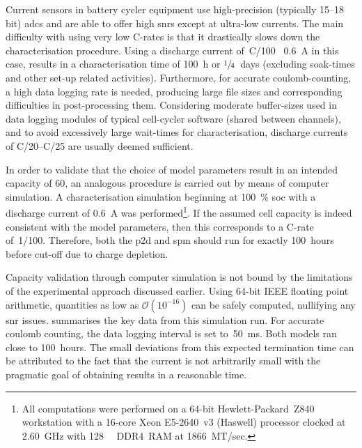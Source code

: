 Current sensors in battery cycler equipment use high-precision (typically 15--18
bit) \glspl{adc}  and are  able to  offer high  \glspl{snr} except  at ultra-low
currents. The main difficulty with using very low C-rates is that it drastically
slows down  the characterisation procedure.  Using a discharge  current of~C/100
\ie~\SI{0.6}{\ampere}  in  this case,  results  in  a characterisation  time  of
\SI{100}{\hour} or \mbox{$\sfrac{1}{4}$}~days (excluding soak-times and
other set-up related activities).  Furthermore, for accurate coulomb-counting, a
high data logging  rate is needed, producing large file  sizes and corresponding
difficulties in post-processing them.  Considering moderate buffer-sizes used in
data logging modules of typical  cell-cycler software (shared between channels),
and  to  avoid  excessively  large wait-times  for  characterisation,  discharge
currents of C/20--C/25 are usually deemed sufficient.

In    order   to    validate    that   the    choice    of   model    parameters
result   in   an   intended   capacity  of   \SI{60}{\amphour},   an   analogous
procedure   is    carried   out   by    means   of   computer    simulation.   A
characterisation  simulation  beginning  at  \SI{100}{\percent}  \gls{soc}  with
a   discharge   current    of   \SI{0.6}{\ampere}   was   performed\footnote{All
computations  were  performed  on   a  64-bit  Hewlett-Packard~Z840  workstation
with   a   \mbox{16-core}   \mbox{\textsuperscript{\textregistered}}
\mbox{Xeon\textsuperscript{\textregistered}}     \mbox{E5-2640~v3}     (Haswell)
processor clocked  at \SI{2.60}{\giga\hertz} with  \SI{128}{\giga\byte} DDR4~RAM
at 1866~MT/sec.}.  If the assumed  cell capacity  is indeed consistent  with the
model parameters,  then this corresponds to  a C-rate of~1/100.  Therefore, both
the \gls{p2d} and \gls{spm} should run  for exactly 100~hours before cut-off due
to charge depletion.


Capacity validation through computer simulation  is not bound by the limitations
of the experimental approach discussed earlier. Using 64-bit IEEE floating point
arithmetic,  quantities  as  low  as  ${\mathcal{O}(10^{-16})}$  can  be  safely
computed, nullifying  any \gls{snr} issues.   summarises
the key data  from this simulation run. For accurate  coulomb counting, the data
logging  interval is  set to~\SI{50}{\milli\second}.  Both models  ran close  to
100~hours.  The small  deviations from  this  expected termination  time can  be
attributed  to the  fact that  the  current is  not arbitrarily  small with  the
pragmatic goal of obtaining results in a reasonable time.

